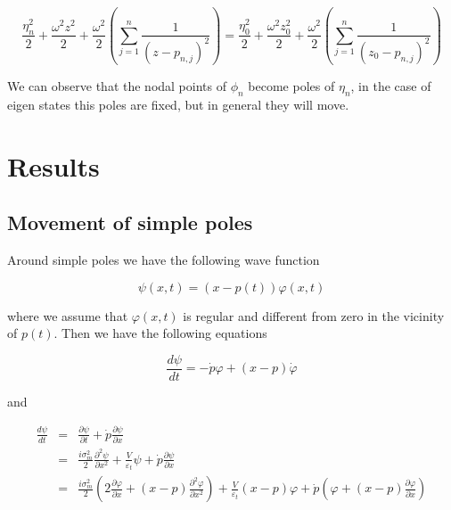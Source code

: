 \documentclass[a4paper,12pt]{article}
\begin{document}
\begin{equation}
\frac{\eta_n^2}{2} + \frac{\omega^2 z^2}{2} + \frac{\omega^2}{2}\left(\sum_{j=1}^{n} \frac{1}{ \left( z - p_{n,j} \right)^2} \right) = \frac{\eta_0^2}{2} + \frac{\omega^2 z_0^2}{2} + \frac{\omega^2}{2}\left(\sum_{j=1}^{n} \frac{1}{ \left( z_0 - p_{n,j} \right)^2} \right)
\end{equation}


We can observe that the nodal points of $\phi_n$ become poles of $\eta_n$, in the case of eigen states this poles are fixed, but in general they will move. 





\section{Results}

\subsection{Movement of simple poles}

Around simple poles we have the following wave function

\begin{equation}
\psi(x,t) = (x-p(t))\varphi(x,t)
\end{equation}

where we assume that $\varphi(x,t)$ is regular and different from zero in the vicinity of $p(t)$. Then we have the following equations

\begin{equation}
\frac{d \psi}{dt}   =  - \dot p \varphi + (x-p) \dot \varphi 
\end{equation}

and

\begin{eqnarray}
\frac{d \psi}{dt} & = & \frac{\partial \psi}{\partial t} + \dot p \frac{\partial \psi}{\partial x} \nonumber \\
& = & \frac{i \sigma_m^2}{2} \frac{\partial^2 \psi}{\partial x^2}  + \frac{V}{\varepsilon_t}\psi + \dot p \frac{\partial \psi}{\partial x} \nonumber \\
& = & \frac{i \sigma_m^2}{2} \left( 2 \frac{\partial \varphi}{\partial x}  + (x-p)\frac{\partial^2 \varphi}{\partial x^2} \right)  + \frac{V}{\varepsilon_t}(x-p)\varphi
+ \dot p \left( \varphi + (x-p)\frac{\partial \varphi}{\partial x} \right)
\end{eqnarray}
\end{document}
